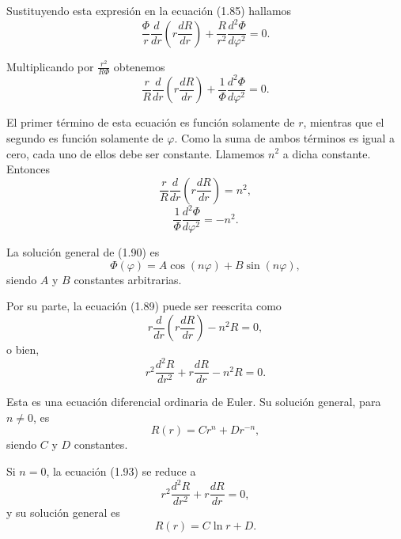 \documentclass[12pt,a4paper]{book}
\begin{document}
Sustituyendo esta expresión en la ecuación (1.85) hallamos
\begin{equation}
\frac{\Phi}{r}\frac{d}{dr}\left(r\frac{dR}{dr}\right) + \frac{R}{r^2}\frac{d^2\Phi}{d\varphi^2} = 0.
\end{equation}

Multiplicando por $\frac{r^2}{R\Phi}$ obtenemos
\begin{equation}
\frac{r}{R}\frac{d}{dr}\left(r\frac{dR}{dr}\right) + \frac{1}{\Phi}\frac{d^2\Phi}{d\varphi^2} = 0.
\end{equation}

El primer término de esta ecuación es función solamente de $r$, mientras que el segundo es función solamente de $\varphi$. Como la suma de ambos términos es igual a cero, cada uno de ellos debe ser constante. Llamemos $n^2$ a dicha constante. Entonces
\begin{equation}
\frac{r}{R}\frac{d}{dr}\left(r\frac{dR}{dr}\right) = n^2,
\end{equation}
\begin{equation}
\frac{1}{\Phi}\frac{d^2\Phi}{d\varphi^2} = -n^2.
\end{equation}

La solución general de (1.90) es
\begin{equation}
\Phi(\varphi) = A\cos(n\varphi) + B\sin(n\varphi),
\end{equation}
siendo $A$ y $B$ constantes arbitrarias.

Por su parte, la ecuación (1.89) puede ser reescrita como
\begin{equation}
r\frac{d}{dr}\left(r\frac{dR}{dr}\right) - n^2R = 0,
\end{equation}
o bien,
\begin{equation}
r^2\frac{d^2R}{dr^2} + r\frac{dR}{dr} - n^2R = 0.
\end{equation}

Esta es una ecuación diferencial ordinaria de Euler. Su solución general, para $n \neq 0$, es
\begin{equation}
R(r) = Cr^n + Dr^{-n},
\end{equation}
siendo $C$ y $D$ constantes.

Si $n = 0$, la ecuación (1.93) se reduce a
\begin{equation}
r^2\frac{d^2R}{dr^2} + r\frac{dR}{dr} = 0,
\end{equation}
y su solución general es
\begin{equation}
R(r) = C\ln r + D.
\end{equation}
\end{document}
